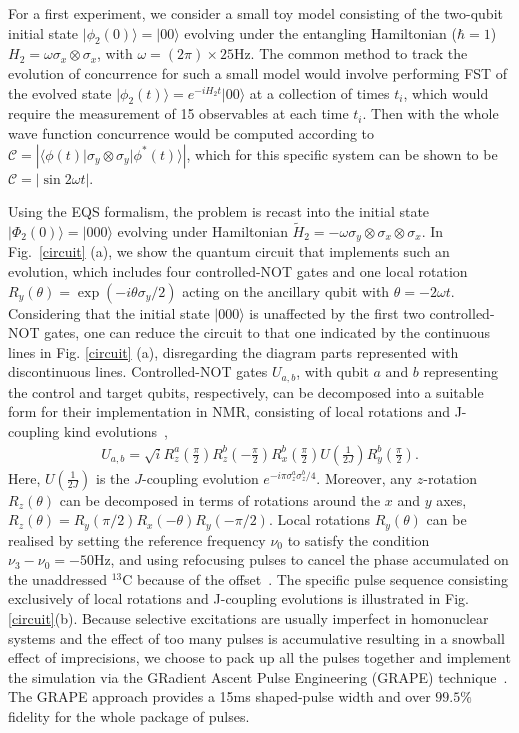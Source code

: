 \documentclass[10pt,nofootinbib,notitlepage,twocolumn,superscriptaddress]{revtex4-1}
\theoremstyle{plain}
\theoremstyle{definition}
\newcommand{\bra}[1]{\mbox{$\langle #1|$}}
\newcommand{\ket}[1]{\ensuremath{|#1\rangle}}
\begin{document}
For a first experiment, we consider a small toy model consisting of the two-qubit initial state $\ket{\phi_2(0)}=\ket{00}$ evolving under the entangling Hamiltonian ($\hbar=1$) $H_2= \omega \sigma_x\otimes \sigma_x$, with $\omega=(2\pi)\times25$Hz. The common method to track the evolution of concurrence for such a small model would involve performing FST of the evolved state $\ket{\phi_2(t)}=e^{-iH_2t}\ket{00}$ at a collection of times $t_i$, which would require the measurement of 15 observables at each time $t_i$. Then with the whole wave function concurrence would be computed according to $\mathcal{C}=\left| \bra{\phi(t)}\sigma_y \otimes \sigma_y\ket{\phi^*(t)}\right|$, which for this specific system can be shown to be $\mathcal{C}=\left| \sin{2 \omega t}\right|$.

Using the EQS formalism, the problem is recast into the initial state $\ket{\Phi_2(0)}=\ket{000}$ evolving under Hamiltonian  ${\tilde{H}_2=-\omega \sigma_y\otimes \sigma_x\otimes \sigma_x}$.  In Fig.~\ref{circuit} (a), we show the quantum circuit that implements such an evolution, which includes four controlled-NOT gates and one local rotation $R_y(\theta)=\exp(-i\theta\sigma_y/2)$ acting on the ancillary qubit with $\theta=-2\omega t $. Considering that the initial state $\ket{000}$ is unaffected by the first two controlled-NOT gates, one can reduce the circuit to that one indicated by the continuous lines in Fig. \ref{circuit} (a), disregarding the diagram parts represented with discontinuous lines. Controlled-NOT gates $U_{a,b}$, with qubit $a$ and $b$ representing the control and target qubits, respectively, can be decomposed into a suitable form for their implementation in NMR, consisting of local rotations and J-coupling kind evolutions~\cite{xin15},
\begin{eqnarray}
U_{a,b} = \sqrt{i}R^a_z(\frac{\pi}{2})R^b_z(-\frac{\pi}{2})R^b_x(\frac{\pi}{2})U(\frac{1}{2J})R^b_y(\frac{\pi}{2}).
\label{decompose}
\end{eqnarray}
Here, $U(\frac{1}{2J})$ is the $J$-coupling evolution $e^{-i\pi\sigma^a_z\sigma^b_z/4}$. Moreover, any $z$-rotation $R_z(\theta)$ can be decomposed in terms of rotations around the $x$ and $y$ axes, $R_z(\theta)=R_y(\pi/2)R_x(-\theta)R_y(-\pi/2)$.  Local rotations $R_y(\theta)$ can be realised by setting the reference frequency $\nu_0$ to satisfy the condition $\nu_3-\nu_0=-50$Hz, and using refocusing pulses to cancel the phase accumulated on the unaddressed $^{13}$C because of the offset~\cite{refc}. The specific pulse sequence consisting exclusively of local rotations and J-coupling evolutions is illustrated in Fig. \ref{circuit}(b). Because selective excitations are usually imperfect in homonuclear systems and the effect of too many pulses is accumulative resulting in a snowball effect of imprecisions, we choose to pack up all the pulses together and implement the simulation via the GRadient Ascent Pulse Engineering (GRAPE) technique~\cite{Khaneja, Ryan}. The GRAPE approach provides a 15ms shaped-pulse width and over $99.5\%$ fidelity for the whole package of pulses.
\end{document}

